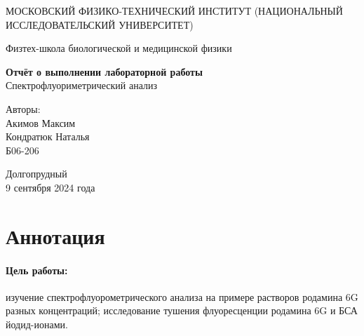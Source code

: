 \documentclass{article}
\begin{document}
\begin{titlepage}
	\begin{center}
		{\large МОСКОВСКИЙ ФИЗИКО-ТЕХНИЧЕСКИЙ ИНСТИТУТ (НАЦИОНАЛЬНЫЙ ИССЛЕДОВАТЕЛЬСКИЙ УНИВЕРСИТЕТ)}
	\end{center}
	\begin{center}
		{\large Физтех-школа биологической и медицинской физики}
	\end{center}
	
	
	\vspace{4.5cm}
	{\huge
		\begin{center}
			{\bf Отчёт о выполнении лабораторной работы}\\
			Спектрофлуориметрический анализ
		\end{center}
	}
	\vspace{5cm}
	\begin{flushright}
		{\LARGE Авторы:\\ Акимов Максим \\ Кондратюк Наталья \\
			\vspace{0.2cm}
			Б06-206}
	\end{flushright}
	\vspace{5cm}
	\begin{center}
		Долгопрудный 
       \\9 сентября 2024 года
	\end{center}
 
\end{titlepage}

\newpage 
\section{Аннотация}

\paragraph*{Цель работы:} изучение спектрофлуорометрического анализа на примере растворов родамина 6G разных концентраций; исследование тушения флуоресценции родамина 6G и БСА йодид-ионами.
\end{document}
